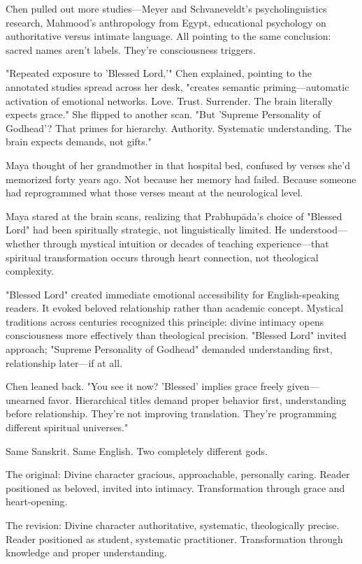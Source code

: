 \documentclass[12pt,twoside]{book}
\begin{document}
Chen pulled out more studies—Meyer and Schvaneveldt's psycholinguistics research, Mahmood's anthropology from Egypt, educational psychology on authoritative versus intimate language. All pointing to the same conclusion: sacred names aren't labels. They're consciousness triggers.

"Repeated exposure to 'Blessed Lord,'" Chen explained, pointing to the annotated studies spread across her desk, "creates semantic priming—automatic activation of emotional networks. Love. Trust. Surrender. The brain literally expects grace." She flipped to another scan. "But 'Supreme Personality of Godhead'? That primes for hierarchy. Authority. Systematic understanding. The brain expects demands, not gifts."

Maya thought of her grandmother in that hospital bed, confused by verses she'd memorized forty years ago. Not because her memory had failed. Because someone had reprogrammed what those verses meant at the neurological level.

Maya stared at the brain scans, realizing that Prabhupāda's choice of "Blessed Lord" had been spiritually strategic, not linguistically limited. He understood—whether through mystical intuition or decades of teaching experience—that spiritual transformation occurs through heart connection, not theological complexity.

"Blessed Lord" created immediate emotional accessibility for English-speaking readers. It evoked beloved relationship rather than academic concept. Mystical traditions across centuries recognized this principle: divine intimacy opens consciousness more effectively than theological precision. "Blessed Lord" invited approach; "Supreme Personality of Godhead" demanded understanding first, relationship later—if at all.

Chen leaned back. "You see it now? 'Blessed' implies grace freely given—unearned favor. Hierarchical titles demand proper behavior first, understanding before relationship. They're not improving translation. They're programming different spiritual universes."

Same Sanskrit. Same English. Two completely different gods.

The original: Divine character gracious, approachable, personally caring. Reader positioned as beloved, invited into intimacy. Transformation through grace and heart-opening.

The revision: Divine character authoritative, systematic, theologically precise. Reader positioned as student, systematic practitioner. Transformation through knowledge and proper understanding.
\end{document}
